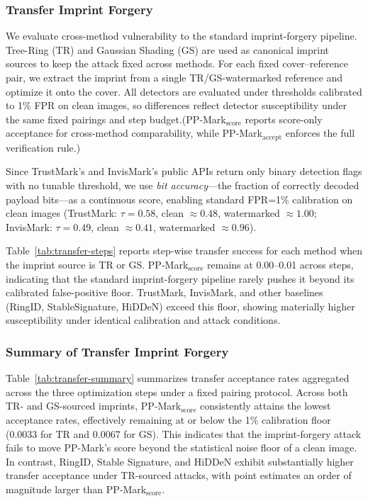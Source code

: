 \documentclass{article}
\theoremstyle{plain}
\theoremstyle{definition}
\theoremstyle{remark}
\begin{document}
  \subsubsection{Transfer Imprint Forgery} 
  We evaluate cross-method vulnerability to the standard imprint-forgery pipeline. Tree-Ring (TR) and Gaussian Shading (GS) are used as canonical imprint sources to keep the attack fixed across methods. For each fixed cover--reference pair, we extract the imprint from a single TR/GS-watermarked reference and optimize it onto the cover. All detectors are evaluated under thresholds calibrated to 1\% FPR on clean images, so differences reflect detector susceptibility under the same fixed pairings and step budget.(PP‑Mark$_{\mathrm{score}}$ reports score-only acceptance for cross-method comparability, while PP‑Mark$_{\mathrm{accept}}$ enforces the full verification rule.)
  
  Since TrustMark's \cite{bui2023trustmark} and InvisMark's \cite{xu2024invismark} public APIs return only binary detection flags with no tunable threshold, we use \emph{bit accuracy}---the fraction of correctly decoded payload bits---as a continuous score, enabling standard FPR=1\% calibration on clean images (TrustMark: $\tau{=}0.58$, clean ${\approx}0.48$, watermarked ${\approx}1.00$; InvisMark: $\tau{=}0.49$, clean ${\approx}0.41$, watermarked ${\approx}0.96$).

  Table~\ref{tab:transfer-steps} reports step-wise transfer success for each method when the imprint source is TR or GS. PP‑Mark$_{\mathrm{score}}$ remains at 0.00--0.01 across steps, indicating that the standard imprint-forgery pipeline rarely pushes it beyond its calibrated false-positive floor. TrustMark, InvisMark, and other baselines (RingID, StableSignature, HiDDeN) exceed this floor, showing materially higher susceptibility under identical calibration and attack conditions.
  
  \subsubsection{Summary of Transfer Imprint Forgery}
Table~\ref{tab:transfer-summary} summarizes transfer acceptance rates aggregated across the three optimization steps under a fixed pairing protocol. Across both TR- and GS-sourced imprints, PP‑Mark$_{\mathrm{score}}$ consistently attains the lowest acceptance rates, effectively remaining at or below the 1\% calibration floor (0.0033 for TR and 0.0067 for GS). This indicates that the imprint-forgery attack fails to move PP-Mark’s score beyond the statistical noise floor of a clean image. In contrast, RingID, Stable Signature, and HiDDeN exhibit substantially higher transfer acceptance under TR-sourced attacks, with point estimates an order of magnitude larger than PP‑Mark$_{\mathrm{score}}$. 
\end{document}
